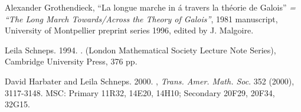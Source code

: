 \documentclass[12pt]{article}
\theoremstyle{plain}
\theoremstyle{definition}
\numberwithin{equation}{section}
\begin{document}
\begin{thebibliography}{99}
Alexander Grothendieck, ``La longue marche in \'a travers la th\'eorie de Galois'' 
\emph{= ``The Long March Towards/Across the Theory of Galois''}, 1981 manuscript, University of Montpellier preprint series 1996, edited by J. Malgoire. 

Leila Schneps. 1994. 
.
(London Mathematical Society Lecture Note Series), Cambridge University Press, 376 pp.

David Harbater and Leila Schneps. 2000.
, \emph{Trans. Amer. Math. Soc}. 352 (2000), 3117-3148. 
MSC: Primary 11R32, 14E20, 14H10; Secondary 20F29, 20F34, 32G15.

\end{thebibliography}
\end{document}
